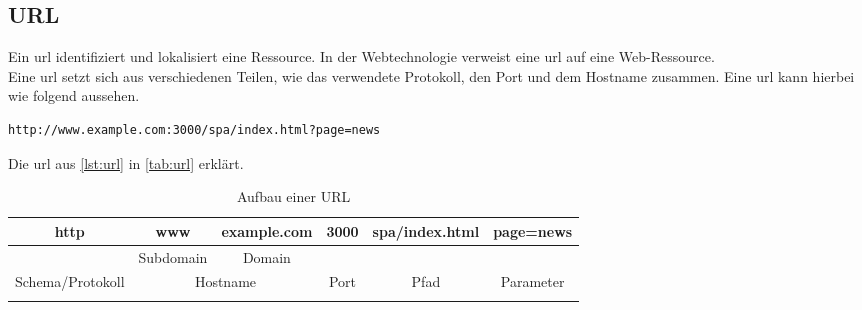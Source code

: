 \subsection{URL}
\label{sec:url}
Ein \acf{url} identifiziert und lokalisiert eine Ressource. In der Webtechnologie verweist eine \ac{url} auf eine Web-Ressource. \\
Eine \ac{url} setzt sich aus verschiedenen Teilen, wie das verwendete Protokoll, den Port und dem Hostname  zusammen. Eine \ac{url} kann hierbei wie folgend aussehen.

\begin{lstlisting}[style=jcr, caption=Eine URL, label=lst:url]
http://www.example.com:3000/spa/index.html?page=news
\end{lstlisting}
Die \ac{url} aus \autoref{lst:url} in \autoref{tab:url} erklärt.
\begin{longtable}{|c|c|c|c|c|c|} 
	\hline 
	http & www & example.com & 3000 & spa/index.html & page=news\\ 
	
	\hline 
	 & Subdomain\index{Subdomain|see{Domain Subdomain}} & Domain\index{Domain} & & & \\
	\hline 
	Schema/Protokoll & \multicolumn{2}{c|}{Hostname} & Port & Pfad & Parameter\\
	\hline
	\caption{Aufbau einer URL}\label{tab:url}
\end{longtable}